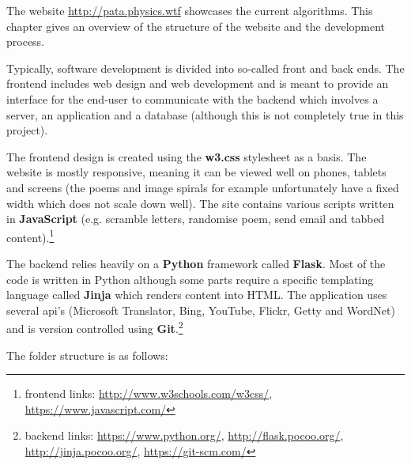 
The website \url{http://pata.physics.wtf} showcases the current algorithms. This chapter gives an overview of the structure of the website and the development process.


Typically, software development is divided into so-called front and back ends. The frontend includes web design and web development and is meant to provide an interface for the end-user to communicate with the backend which involves a server, an application and a database (although this is not completely true in this project).

The frontend design is created using the \textbf{w3.css} stylesheet as a basis. The website is mostly responsive, meaning it can be viewed well on phones, tablets and screens (the poems and image spirals for example unfortunately have a fixed width which does not scale down well). The site contains various scripts written in \textbf{JavaScript} (e.g. scramble letters, randomise poem, send email and tabbed content).\footnote{frontend links: \url{http://www.w3schools.com/w3css/}, \url{https://www.javascript.com/}}

The backend relies heavily on a \textbf{Python} framework called \textbf{Flask}. Most of the code is written in Python although some parts require a specific templating language called \textbf{Jinja} which renders content into HTML. The application uses several \acrshort{api}'s (Microsoft Translator, Bing, YouTube, Flickr, Getty and WordNet) and is version controlled using \textbf{Git}.\footnote{backend links: \url{https://www.python.org/}, \url{http://flask.pocoo.org/}, \url{http://jinja.pocoo.org/}, \url{https://git-scm.com/}}

The folder structure is as follows:

